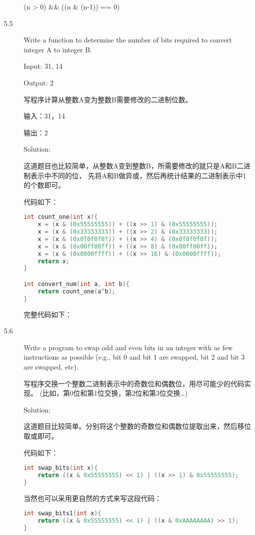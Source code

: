 \begin{description}
(n > 0) \&\& ((n \& (n-1)) == 0)


\item[5.5] Write a function to determine the number of bits required to convert integer A to integer B.

Input: 31, 14

Output: 2

写程序计算从整数A变为整数B需要修改的二进制位数。

输入：31，14

输出：2

Solution:

这道题目也比较简单，从整数A变到整数B，所需要修改的就只是A和B二进制表示中不同的位， 先将A和B做异或，然后再统计结果的二进制表示中1的个数即可。

代码如下：
\begin{lstlisting}[language=C++]
int count_one(int x){
    x = (x & (0x55555555)) + ((x >> 1) & (0x55555555));
    x = (x & (0x33333333)) + ((x >> 2) & (0x33333333));
    x = (x & (0x0f0f0f0f)) + ((x >> 4) & (0x0f0f0f0f));
    x = (x & (0x00ff00ff)) + ((x >> 8) & (0x00ff00ff));
    x = (x & (0x0000ffff)) + ((x >> 16) & (0x0000ffff));
    return x;
}

int convert_num(int a, int b){
    return count_one(a^b);
}
\end{lstlisting}
完整代码如下：



\item[5.6] Write a program to swap odd and even bits in an integer with as few instructions as possible (e.g., bit 0 and bit 1 are swapped, bit 2 and bit 3 are swapped, etc).

写程序交换一个整数二进制表示中的奇数位和偶数位，用尽可能少的代码实现。 (比如，第0位和第1位交换，第2位和第3位交换…)

Solution:

这道题目比较简单。分别将这个整数的奇数位和偶数位提取出来，然后移位取或即可。

代码如下：
\begin{lstlisting}[language=C++]
int swap_bits(int x){
    return ((x & 0x55555555) << 1) | ((x >> 1) & 0x55555555);
}
\end{lstlisting}

当然也可以采用更自然的方式来写这段代码：
\begin{lstlisting}[language=C++]
int swap_bits1(int x){
    return ((x & 0x55555555) << 1) | ((x & 0xAAAAAAAA) >> 1);
}
\end{lstlisting}


\end{description}
